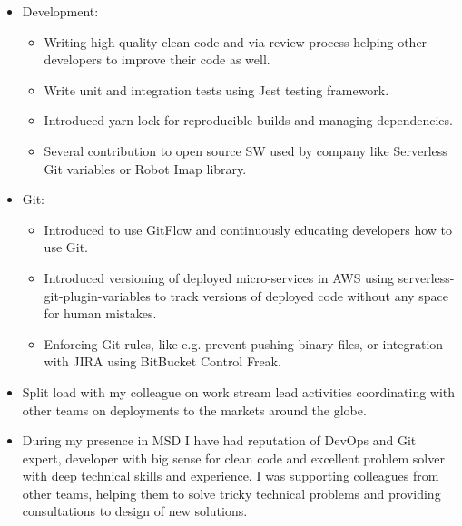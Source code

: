 \documentclass[11pt,a4paper,sans]{moderncv}
\begin{document}
{\begin{itemize}
\begin{itemize}
			\end{itemize}
			\item Development:
			\begin{itemize}
				\item Writing high quality clean code and via review process helping other developers to improve their code as well.
				\item Write unit and integration tests using Jest testing framework.
				\item Introduced yarn lock for reproducible builds and managing dependencies.
				\item Several contribution to open source SW used by company like Serverless Git variables or Robot Imap library.
			\end{itemize}
			\item Git:
			\begin{itemize}
				\item Introduced to use GitFlow and continuously educating developers how to use Git.
				\item Introduced versioning of deployed micro-services in AWS using serverless-git-plugin-variables to track versions of deployed code without any space for human mistakes.
				\item Enforcing Git rules, like e.g. prevent pushing binary files, or integration with JIRA using BitBucket Control Freak.
			\end{itemize}
			\item Split load with my colleague on work stream lead activities coordinating with other teams on deployments to the markets around the globe.
			\item During my presence in MSD I have had reputation of DevOps and Git expert, developer with big sense for clean code and excellent problem solver with deep technical skills and experience. I was supporting colleagues from other teams, helping them to solve tricky technical problems and providing consultations to design of new solutions.
		\end{itemize}
	}
\end{document}
